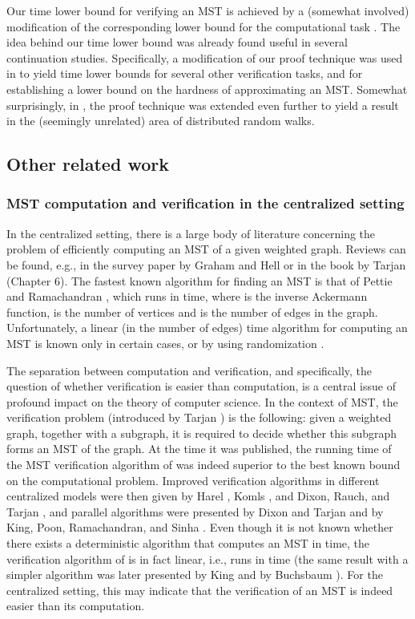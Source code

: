 \documentclass[11pt,letter]{article}
\begin{document}
Our  time lower bound for verifying an MST is achieved by a (somewhat involved) 
modification of the corresponding lower bound for the computational task 
\cite{PR_00}. 
The idea behind our time lower bound was already found useful in several 
continuation studies. Specifically, a modification of our proof technique 
was used in \cite{DHKKNPPW} to yield time lower bounds for several other 
verification tasks, and for establishing a lower bound on the hardness 
of approximating an MST. Somewhat surprisingly, in \cite{NDP11}, 
the proof technique was extended even further to yield a result 
in the (seemingly unrelated) area of distributed random walks. 


\subsection{Other related work}
\subsubsection{MST computation and verification in the centralized setting}  In the centralized setting, there is a large body of literature concerning the
problem of efficiently computing an MST of a given weighted graph.
Reviews can be found, e.g., in the survey paper by Graham and Hell \cite{GH85} 
or in the book by Tarjan \cite{T83} (Chapter 6). 
The fastest known algorithm for finding an MST is that of 
Pettie and Ramachandran  \cite{optimalMST}, which runs
in  time, where  is 
 the inverse Ackermann function, 
 is the number of vertices 
and  is the number of edges in the graph. 
Unfortunately, a linear (in the number of edges) time algorithm 
for computing an MST is known only in certain cases, or by using randomization
\cite{FredmanWillard,KargerKleinTarjan}. 

The separation between computation and verification, and specifically,
the question of whether verification is easier than computation, is a central 
issue of profound impact on the theory of computer science. 
In the context of MST, the  verification problem 
(introduced by Tarjan \cite{Tarjan79}) is the following:
given a weighted graph, together with a subgraph, 
it is required to decide whether this subgraph forms an MST of the graph. 
At the time it was published, the running time of the MST verification 
algorithm of \cite{Tarjan79} was indeed superior to the best known bound
on the computational problem. Improved verification  algorithms in different
centralized models were then given by Harel \cite{Harel85},
Komls \cite{Komlos}, and Dixon, Rauch, and Tarjan
\cite{DixonRauchTarjan}, and parallel algorithms were presented by Dixon and
Tarjan \cite{DixonTarjan} and by King, Poon, Ramachandran, and Sinha
\cite{king2}. 
Even though it is not known whether there exists a deterministic algorithm that 
computes an MST in   time, the verification algorithm of 
\cite{DixonRauchTarjan} is in fact linear, i.e., runs in time  (the same result with a simpler 
algorithm was later presented by King \cite{king97} and by Buchsbaum \cite{BGKRTW_08}). 
For the centralized setting, this may indicate that the verification 
of an MST is indeed easier than its computation.
\end{document}
